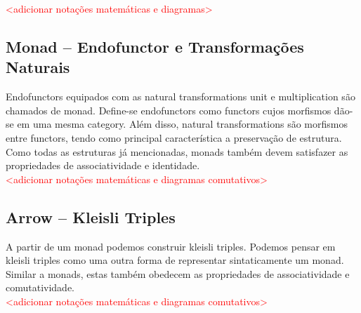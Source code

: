 \documentclass[10pt, conference]{IEEEtran}
\begin{document}
\textcolor{red}{<adicionar notações matemáticas e diagramas>}

\subsection{Monad -- Endofunctor e Transformações Naturais}

Endofunctors equipados com as natural transformations unit e multiplication \cite{maclane1971mat} são chamados de monad. Define-se endofunctors como functors cujos morfismos dão-se em uma mesma category. Além disso, natural transformations são morfismos entre functors, tendo como principal característica a preservação de estrutura. Como todas as estruturas já mencionadas, monads também devem satisfazer as propriedades de associatividade e identidade.\\

\textcolor{red}{<adicionar notações matemáticas e diagramas comutativos>}

\subsection{Arrow -- Kleisli Triples}

A partir de um monad podemos construir kleisli triples. Podemos pensar em kleisli triples como uma outra forma de representar sintaticamente um monad. Similar a monads, estas também obedecem as propriedades de associatividade e comutatividade.\\

\textcolor{red}{<adicionar notações matemáticas e diagramas comutativos>}



\end{document}
